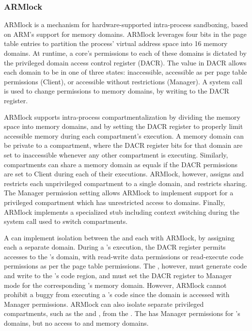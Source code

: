 \subsubsection{ARMlock}
ARMlock is a mechanism for hardware-supported intra-process sandboxing,
based on ARM's support for memory domains.
ARMlock leverages four bits in the page table entries to partition the
process' virtual address space into 16 memory domains.
At runtime, a core's permissions to each of these domains is dictated
by the privileged domain access control register (DACR).
The value in DACR allows each domain to be in one of three states: 
inaccessible, accessible as per page table permissions (Client), or
accessible without restrictions (Manager).
A system call is used to change permissions to memory domains, by
writing to the DACR register.

ARMlock supports intra-process compartmentalization by dividing the
memory space into memory domains, and by setting the DACR register
to properly limit accessible memory during each compartment's execution.
A memory domain can be private to a compartment, where the DACR register
bits for that domain are set to inaccessible whenever any other compartment
is executing. 
Similarly, compartments can share a memory domain as equals if the DACR
permissions are set to Client during each of their executions.
ARMlock, however, assigns and restricts each unprivileged compartment to a
single domain, and restricts sharing.
The Manager permission setting allows ARMlock to implement support for
a privileged compartment which has unrestricted access to domains.
Finally, ARMlock implements a specialized stub including context switching
during the system call used to switch compartments.

A \browser can implement isolation between the \renderer and each
\sandbox with ARMlock, by assigning each \sandbox a separate domain.
During a \sandbox's execution, the DACR register permits accesses to
the \sandbox's domain, with read-write data permissions or read-execute
code permissions as per the page table permissions.
The \renderer, however, must generate code and write to the \sandbox's
code region, and must set the DACR register to Manager mode for the
corresponding \sandbox's memory domain.
However, ARMlock cannot prohibit a buggy \renderer from executing
a \sandbox's code since the domain is accessed with Manager permissions.
ARMlock can also isolate separate privileged compartments, such as the
\manager and \local, from the \renderer.
The \renderer has Manager permissions for \sandbox's domains, but no
access to \manager and \local memory domains.

